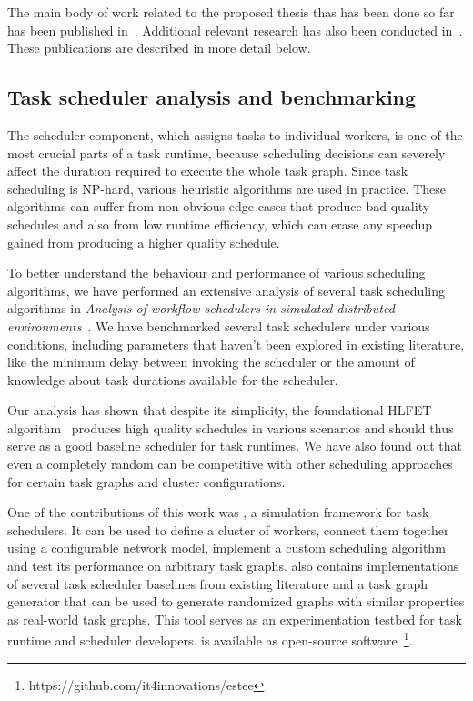 The main body of work related to the proposed thesis thas has been done so far has been published
in~\cite{estee, rsds}. Additional relevant research has also been conducted
in~\cite{spin,spin2}. These publications are described in more detail below.

\subsection{Task scheduler analysis and benchmarking}
The scheduler component, which assigns tasks to individual workers, is one of the
most crucial parts of a task runtime, because scheduling decisions can severely affect the
duration required to execute the whole task graph. Since task scheduling is NP-hard, various
heuristic algorithms are used in practice. These algorithms can suffer from non-obvious edge cases
that produce bad quality schedules and also from low runtime efficiency, which can erase any
speedup gained from producing a higher quality schedule.

To better understand the behaviour and performance of various scheduling algorithms, we have
performed an extensive analysis of several task scheduling algorithms in
\emph{Analysis of workflow schedulers in simulated distributed environments}~\cite{estee}.
We have benchmarked several task schedulers under various conditions, including parameters that
haven't been explored in existing literature, like the minimum delay between invoking the scheduler
or the amount of knowledge about task durations available for the scheduler.

Our analysis has shown that despite its simplicity, the foundational HLFET
algorithm~\cite{hlfet1974} produces high quality schedules in various scenarios and should thus
serve as a good baseline scheduler for task runtimes. We have also found out that even a
completely random can be competitive with other scheduling approaches for certain task graphs
and cluster configurations.

One of the contributions of this work was \estee{}, a simulation framework for task
schedulers. It can be used to define a cluster of workers, connect them together using a
configurable network model, implement a custom scheduling algorithm and test its performance on
arbitrary task graphs. \estee{} also contains implementations of several task scheduler
baselines from existing literature and a task graph generator that can be used to generate
randomized graphs with similar properties as real-world task graphs. This tool serves as an
experimentation testbed for task runtime and scheduler developers. \estee{} is
available as open-source software~\footnote{https://github.com/it4innovations/estee}.

